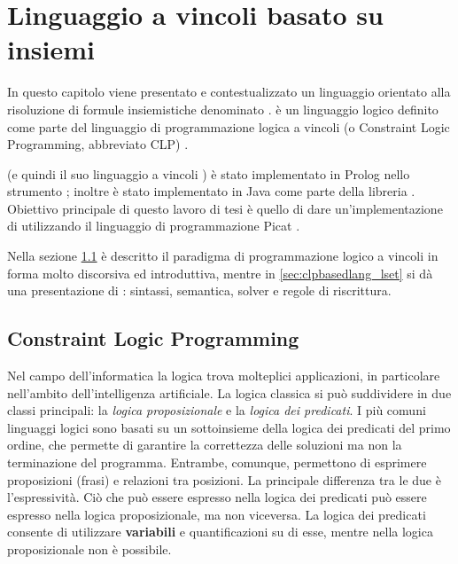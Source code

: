 \documentclass[12pt,a4paper,openright]{book}  %
\begin{document}
\thispagestyle{fancy}
\renewcommand{\headrulewidth}{0pt}
\lhead{\thepage}
\cfoot{}



\chapter{Linguaggio a vincoli basato su insiemi}
\label{ch:clpbasedlang}


In questo capitolo viene presentato e contestualizzato un linguaggio
orientato alla risoluzione di formule insiemistiche denominato
\lset{}. \lset{} è un linguaggio logico definito come parte del
linguaggio di programmazione logica a vincoli (o Constraint Logic
Programming, abbreviato CLP) \clpset{} \cite{Dovier00}.

\clpset{} (e quindi il suo linguaggio a vincoli \lset{}) è stato
implementato in Prolog nello strumento \setlog{} \cite{SetLog};
inoltre \lset{} è stato implementato in Java come parte della libreria
\jsetl{} \cite{JSetL}. Obiettivo principale di questo lavoro di tesi è
quello di dare un’implementazione di \lset{} utilizzando il linguaggio
di programmazione Picat \cite{PicatLang}.

Nella sezione \ref{sec:clpbasedlang_clp} è descritto il paradigma di
programmazione logico a vincoli in forma molto discorsiva ed
introduttiva, mentre in \ref{sec:clpbasedlang_lset} si dà una
presentazione di \lset{}: sintassi, semantica, solver e regole di
riscrittura.

\section{Constraint Logic Programming}
\label{sec:clpbasedlang_clp}

Nel campo dell'informatica la logica trova molteplici applicazioni, in
particolare nell'ambito dell'intelligenza artificiale. La logica
classica si può suddividere in due classi principali: la \emph{logica
  proposizionale} e la \emph{logica dei predicati}.  I più comuni
linguaggi logici sono basati su un sottoinsieme della logica dei
predicati del primo ordine, che permette di garantire la correttezza
delle soluzioni ma non la terminazione del programma. Entrambe,
comunque, permettono di esprimere proposizioni (frasi) e relazioni tra
posizioni. La principale differenza tra le due è l'espressività. Ciò
che può essere espresso nella logica dei predicati può essere espresso
nella logica proposizionale, ma non viceversa. La logica dei predicati
consente di utilizzare \textbf{variabili} e quantificazioni su di
esse, mentre nella logica proposizionale non è possibile.
\end{document}
